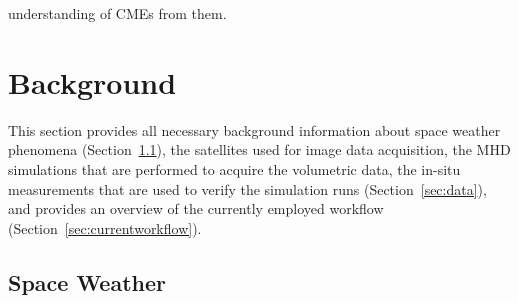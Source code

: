\documentclass[journal]{vgtc}                %
\begin{document}
understanding of CMEs from them.


\section{Background}

This section provides all necessary background information about space weather phenomena (Section~\ref{sec:spaceweather}), the satellites used for image data acquisition, the MHD simulations that are performed to acquire the volumetric data, the in-situ measurements that are used to verify the simulation runs (Section~\ref{sec:data}), and provides an overview of the currently employed workflow (Section~\ref{sec:currentworkflow}).

\subsection{Space Weather} \label{sec:spaceweather}
\end{document}
